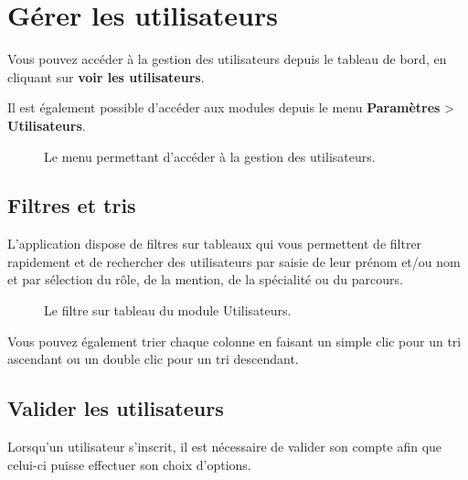 \documentclass[letterpaper,10pt,french]{sphinxmanual}
\begin{document}
\section{Gérer les utilisateurs}
\label{admin:gerer-les-utilisateurs}
Vous pouvez accéder à la gestion des utilisateurs depuis le tableau de bord, en cliquant sur \textbf{voir les utilisateurs}.

Il est également possible d'accéder aux modules depuis le menu \textbf{Paramètres} \textgreater{} \textbf{Utilisateurs}.
\begin{figure}[htbp]
\centering
\capstart

\caption{Le menu permettant d'accéder à la gestion des utilisateurs.}\end{figure}


\subsection{Filtres et tris}
\label{admin:filtres-et-tris}
L'application dispose de filtres sur tableaux qui vous permettent de filtrer rapidement et de rechercher des utilisateurs par saisie de leur prénom et/ou nom et par sélection du rôle, de la mention, de la spécialité ou du parcours.
\begin{figure}[htbp]
\centering
\capstart

\caption{Le filtre sur tableau du module Utilisateurs.}\end{figure}

Vous pouvez également trier chaque colonne en faisant un simple clic pour un tri ascendant ou un double clic pour un tri descendant.


\subsection{Valider les utilisateurs}
\label{admin:valider-les-utilisateurs}
Lorsqu'un utilisateur s'inscrit, il est nécessaire de valider son compte afin que celui-ci puisse effectuer son choix d'options.
\end{document}
